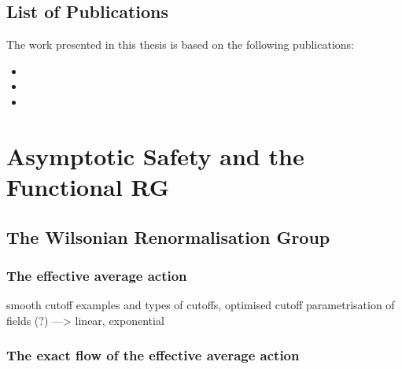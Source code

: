 \documentclass[11pt]{book} %
\numberwithin{equation}{chapter}
\begin{document}
\section*{List of Publications}

The work presented in this thesis is based on the following publications:%
\vspace{0.5em}
\begin{itemize}
  \setlength\itemsep{0.7em}
  \item {}
  \item {}
  \item {}
\end{itemize}


\mainmatter
\chapter[Asymptotic Safety and the Functional Renormalisation Group]{Asymptotic Safety and the Functional RG}

\section{The Wilsonian Renormalisation Group}



\subsection{The effective average action}

smooth cutoff examples and types of cutoffs, optimised cutoff
parametrisation of fields (?) ---> linear, exponential

\subsection{The exact flow of the effective average action}
\end{document}
